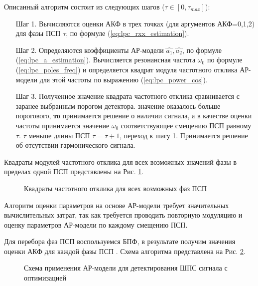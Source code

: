 Описанный алгоритм состоит из следующих шагов (${\tau \in [0, \tau_{max}]}$):
\begin{itemize}[align=left,style=nextline,leftmargin=*,labelsep=\parindent,font=\normalfont]
\item[Шаг 1.] Вычисляются оценки АКФ в трех точках (для аргументов АКФ=0,1,2)
	для фазы ПСП ${\tau}$, по формуле (\ref{eq:lpc_rxx_estimation}). 
\item[Шаг 2.] Определяются коэффициенты АР-модели ${\hat{a_1}, \hat{a_2}}$, 
	по формуле (\ref{eq:lpc_a_estimation}). 
	Вычисляется резонансная частота ${\omega_0}$ по формуле (\ref{eq:lpc_poles_freq})
	и определяется квадрат модуля частотного отклика АР-модели для этой частоты по выражению (\ref{eq:lpc_power_cos}). 
\item[Шаг 3.] Полученное значение квадрата частотного отклика сравнивается с заранее выбранным порогом детектора. 
	  значение оказалось больше порогового, {\bf{то}} 
		принимается решение о наличии сигнала, а в качестве оценки
		частоты принимается значение ${\omega_0}$ соответствующее смещению ПСП равному ${\tau}$. 
	 ${\tau}$ меньше длины ПСП ${\tau = \tau + 1}$, переход к шагу 1.
		Принимается решение об отсутствии гармонического сигнала.
\end{itemize}

Квадраты модулей частотного отклика для всех возможных значений фазы в пределах одной ПСП представлены на Рис. \ref{pic:lpc_1sat_energy}.
\begin{figure}[h]
	\center{}
	\caption{Квадраты частотного отклика для всех возможных фаз ПСП}
	\label{pic:lpc_1sat_energy}
\end{figure}


Алгоритм оценки параметров на основе АР-модели требует значительных вычислительных затрат, так как требуется проводить
повторную модуляцию и оценку параметров \mbox{АР-модели} по каждому смещению ПСП.

Для перебора фаз ПСП воспользуемся БПФ, в результате получим значения оценки АКФ для каждой фазы ПСП \cite{my_lpc_for_1, my_lpc_for_1_controllers}.
Схема алгоритма представлена на Рис. \ref{pic:lpc_basic2}. 

\begin{figure}[h]
	\center{}
	\caption{Схема применения АР-модели для детектирования ШПС сигнала с оптимизацией}
	\label{pic:lpc_basic2}
\end{figure}

